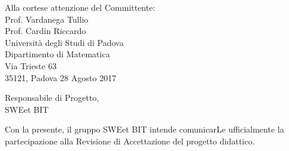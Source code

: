 \begin{minipage}{0.7\textwidth}
	\begin{flushright}
		Alla cortese attenzione del Committente: \\
		Prof. Vardanega Tullio \\
		Prof. Cardin Riccardo \\
		Università degli Studi di Padova \\
		Dipartimento di Matematica \\
		Via Trieste 63\\
		35121, Padova
		\vspace{5mm} 28 Agosto 2017
	\end{flushright}
\end{minipage}

\begin{minipage}{\textwidth}
	\begin{flushleft}
		Responsabile di Progetto,\\
		SWEet BIT\\
	\end{flushleft}
\end{minipage}

\vspace{5mm}Con la presente, il gruppo SWEet BIT intende comunicarLe ufficialmente la partecipazione
alla Revisione di Accettazione del progetto didattico.

